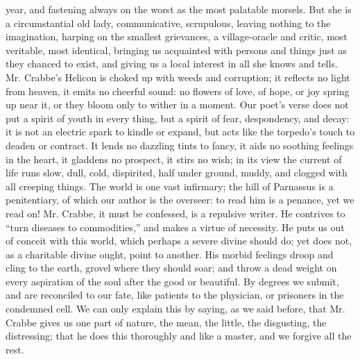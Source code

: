 year, and fastening always on the worst as the most palatable morsels.
But she is a circumstantial old lady, communicative, scrupulous, leaving
nothing to the imagination, harping on the smallest grievances, a
village-oracle and critic, most veritable, most identical, bringing us
acquainted with persons and things just as they chanced to exist, and
giving us a local interest in all she knows and tells. Mr. Crabbe's
Helicon is choked up with weeds and corruption; it reflects no light
from heaven, it emits no cheerful sound: no flowers of love, of hope,
or joy spring up near it, or they bloom only to wither in a moment. Our
poet's verse does not put a spirit of youth in every thing, but a spirit
of fear, despondency, and decay: it is not an electric spark to kindle
or expand, but acts like the torpedo's touch to deaden or contract. It
lends no dazzling tints to fancy, it aids no soothing feelings in the
heart, it gladdens no prospect, it stirs no wish; in its view the
current of life runs slow, dull, cold, dispirited, half under ground,
muddy, and clogged with all creeping things. The world is one vast
infirmary; the hill of Parnassus is a penitentiary, of which our author
is the overseer: to read him is a penance, yet we read on! Mr. Crabbe,
it must be confessed, is a repulsive writer. He contrives to ``turn
diseases to commodities,'' and makes a virtue of necessity. He puts us
out of conceit with this world, which perhaps a severe divine should do;
yet does not, as a charitable divine ought, point to another. His morbid
feelings droop and cling to the earth, grovel where they should soar;
and throw a dead weight on every aspiration of the soul after the good
or beautiful. By degrees we submit, and are reconciled to our fate, like
patients to the physician, or prisoners in the condemned cell. We can
only explain this by saying, as we said before, that Mr. Crabbe gives
us one part of nature, the mean, the little, the disgusting, the
distressing; that he does this thoroughly and like a master, and we
forgive all the rest.


